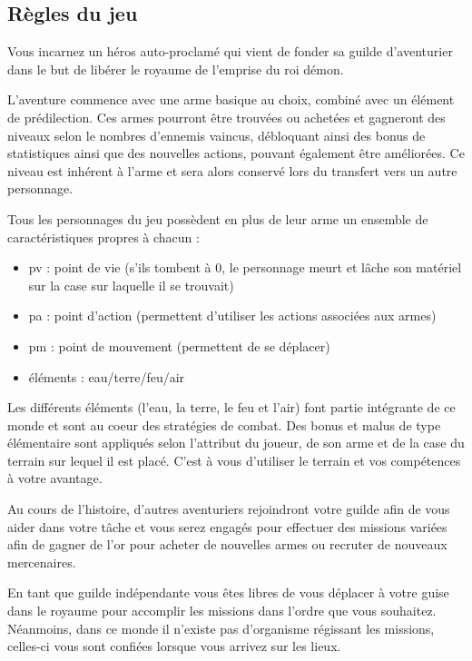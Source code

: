 \documentclass[a4paper,12pt]{article}
\begin{document}
\subsection{Règles du jeu}
    Vous incarnez un héros auto-proclamé qui vient de fonder sa guilde d'aventurier dans le but de libérer le royaume de l'emprise du roi démon.
    
    L'aventure commence avec une arme basique au choix, combiné avec un élément de prédilection. Ces armes pourront être trouvées ou achetées et gagneront des niveaux selon le nombres d'ennemis vaincus, débloquant ainsi des bonus de statistiques ainsi que des nouvelles actions, pouvant également être améliorées. Ce niveau est inhérent à l'arme et sera alors conservé lors du transfert vers un autre personnage. 

    Tous les personnages du jeu possèdent en plus de leur arme un ensemble de caractéristiques propres à chacun :
    \begin{itemize}[noitemsep,topsep=0pt]
        \item pv : point de vie (s'ils tombent à 0, le personnage meurt et lâche son matériel sur la case sur laquelle il se trouvait)
        \item pa : point d'action (permettent d'utiliser les actions associées aux armes)
        \item pm : point de mouvement (permettent de se déplacer)
        \item éléments : eau/terre/feu/air
    \end{itemize}

    Les différents éléments (l'eau, la terre, le feu et l'air) font partie intégrante de ce monde et sont au coeur des stratégies de combat. Des bonus et malus de type élémentaire sont appliqués selon l'attribut du joueur, de son arme et de la case du terrain sur lequel il est placé. C'est à vous d'utiliser le terrain et vos compétences à votre avantage.
    
    Au cours de l'histoire, d'autres aventuriers rejoindront votre guilde afin de vous aider dans votre tâche et vous serez engagés pour effectuer des missions variées afin de gagner de l'or pour acheter de nouvelles armes ou recruter de nouveaux mercenaires.
    
    En tant que guilde indépendante vous êtes libres de vous déplacer à votre guise dans le royaume pour accomplir les missions dans l'ordre que vous souhaitez. Néanmoins, dans ce monde il n'existe pas d'organisme régissant les missions, celles-ci vous sont confiées lorsque vous arrivez sur les lieux.
    
\end{document}
